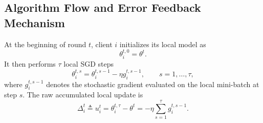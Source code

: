 \documentclass[journal]{IEEEtran}
\begin{document}
\subsection{Algorithm Flow and Error Feedback Mechanism}

At the beginning of round $t$, client $i$ initializes its local model as
\begin{equation}
    \theta_i^{t,0}=\theta^t.
\end{equation}
It then performs $\tau$ local SGD steps
\begin{equation}
    \theta_i^{t,s}=\theta_i^{t,s-1}-\eta g_i^{t,s-1},
    \qquad s=1,\ldots,\tau,
\end{equation}
where $g_i^{t,s-1}$ denotes the stochastic gradient evaluated on the local mini-batch at step $s$. The raw accumulated local update is
\begin{equation}
    \Delta_i^t\triangleq u_i^t
    =\theta_i^{t,\tau}-\theta^t
    =-\eta\sum_{s=1}^{\tau}g_i^{t,s-1}.
\end{equation}
\end{document}

